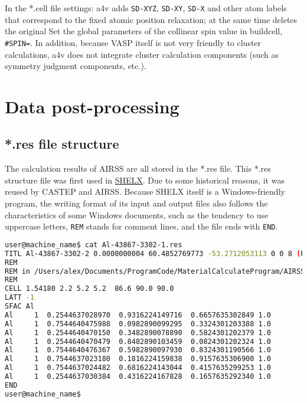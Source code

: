 \documentclass[a4paper, 10pt]{article}
\begin{document}
In the *.cell file settings: a4v adds \verb|SD-XYZ|, \verb|SD-XY|, \verb|SD-X| and other atom labels that correspond to the fixed atomic position relaxation; at the same time deletes the original Set the global parameters of the collinear spin value in buildcell, \verb|#SPIN=|. In addition, because VASP itself is not very friendly to cluster calculations, a4v does not integrate cluster calculation components (such as symmetry judgment components, etc.).

\newpage
\section{Data post-processing}
\subsection{*.res file structure}

The calculation results of AIRSS are all stored in the *.res file. This *.res structure file was first used in \href{https://strucbio.biologie.uni-konstanz.de/ccp4wiki/index.php/SHELXL}{SHELX}. Due to some historical reasons, it was reused by CASTEP and AIRSS. Because SHELX itself is a Windows-friendly program, the writing format of its input and output files also follows the characteristics of some Windows documents, such as the tendency to use uppercase letters, \verb|REM| stands for comment lines, and the file ends with \verb|END|.

\begin{lstlisting}[language={bash}]
user@machine_name$ cat Al-43867-3302-1.res
TITL Al-43867-3302-2 0.0000000004 60.4852769773 -53.2712053113 0 0 8 (P63/mmc) n - 1
REM
REM in /Users/alex/Documents/ProgramCode/MaterialCalculateProgram/AIRSS/airss-0.9/examples/1.1
REM
CELL 1.54180 2.2 5.2 5.2  86.6 90.0 90.0
LATT -1
SFAC Al 
Al     1  0.2544637028970  0.9316224149716  0.6657635302849 1.0
Al     1  0.7544640475988  0.0982890099295  0.3324301203388 1.0
Al     1  0.2544640470150  0.3482890078890  0.5824301202379 1.0
Al     1  0.2544640470479  0.8482890103459  0.0824301202324 1.0
Al     1  0.7544640476367  0.5982890097930  0.8324301190566 1.0
Al     1  0.7544637023180  0.1816224159838  0.9157635306900 1.0
Al     1  0.7544637024482  0.6816224143044  0.4157635299253 1.0
Al     1  0.2544637030384  0.4316224167828  0.1657635292340 1.0
END
user@machine_name$
\end{lstlisting}
\end{document}
